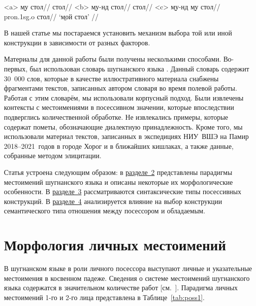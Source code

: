 \a<a> \begingl
\gla \b{му} стол//
 стол//
\endgl
\a<b> \begingl
\gla \b{му-нд} стол//
 стол//
\endgl
\a<c> \begingl
\gla \b{му-нд} \b{му} стол//
 {\sc pron.1sg.o} стол//
\glft ‘\b{мой} стол’ //
\endgl \xe

В нашей статье мы постараемся установить механизм выбора той или иной конструкции в зависимости от разных факторов.

Материалы для данной работы были получены несколькими способами. Во-первых, был использован словарь шугнанского языка \parencite{karamshoev1988}. Данный словарь содержит 30~000 слов, которые в качестве иллюстративного материала снабжены фрагментами текстов, записанных автором словаря во время полевой работы. Работая с этим словарём, мы использовали корпусный подход. Были извлечены контексты с местоимениями в посессивном значении, которые впоследствии подверглись количественной обработке. Не извлекались примеры, которые содержат пометы, обозначающие диалектную принадлежность. Кроме того, мы использовали материал текстов, записанных в экспедициях НИУ~ВШЭ на Памир 2018–2021~годов в городе Хорог и в ближайших кишлаках, а также данные, собранные методом элицитации.

Статья устроена следующим образом: в \hyperref[poss-morph]{разделе~2} представлены парадигмы местоимений шугнанского языка и описаны некоторые их морфологические особенности. В \hyperref[poss-syntax]{разделе~3} рассматриваются синтаксические типы посессивных конструкций. В \hyperref[poss-distrib]{разделе~4} анализируется влияние на выбор конструкции семантического типа отношения между посессором и обладаемым.

\section{Морфология личных местоимений} \label{poss-morph}

В шугнанском языке в роли личного посессора выступают личные и указательные местоимения в косвенном падеже. Сведения о системе местоимений шугнанского языка содержатся в значительном количестве работ [см.~\cites{karamshoev1963}{alamshoev1994}{yusufbekov1998}{edelman1999_shugrush}{edelman_yusufbekov1999_shughni}{edelman_dodykhudoeva2009_shughni}]. Парадигма личных местоимений 1-го и 2-го лица представлена в Таблице~\ref{tab:poss1}.

